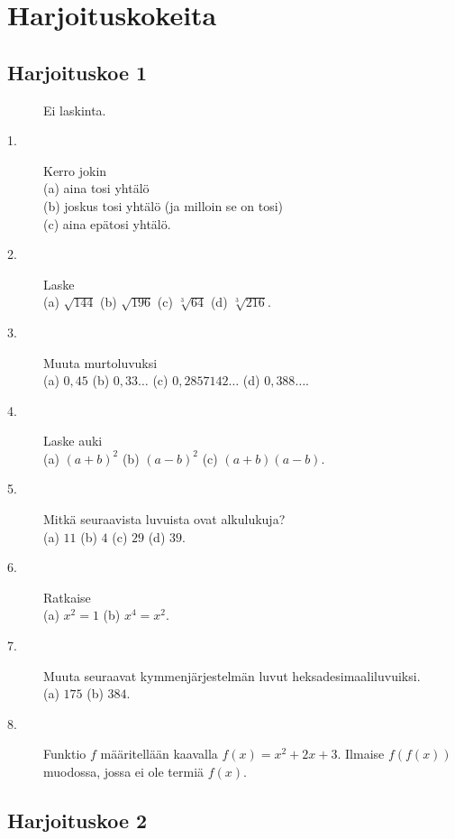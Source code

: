 \chapter{Harjoituskokeita}

\section*{Harjoituskoe 1}

\begin{description}
	\item[] Ei laskinta.
	\item[1.] Kerro jokin \\
	(a) aina tosi yhtälö \\
	(b) joskus tosi yhtälö (ja milloin se on tosi) \\
	(c) aina epätosi yhtälö.
	\item[2.] Laske \\
	(a) $\sqrt{144}$ \qquad
	(b) $\sqrt{196}$ \qquad
	(c) $\sqrt[3]{64}$ \qquad
	(d) $\sqrt[3]{216}$.
	\item[3.] Muuta murtoluvuksi \\
	(a) $0,45$ \qquad
	(b) $0,33\ldots$ \qquad
	(c) $0,2857142\ldots$ \qquad
	(d) $0,388\ldots$.
	\item[4.] Laske auki \\
	(a) $(a+b)^2$ \qquad
	(b) $(a-b)^2$ \qquad
	(c) $(a+b)(a-b)$.
	\item[5.] Mitkä seuraavista luvuista ovat alkulukuja? \\
	(a) $11$ \qquad
	(b) $4$ \qquad
	(c) $29$ \qquad
	(d) $39$.
	\item[6.] Ratkaise \\
	(a) $x^2 = 1$ \qquad
	(b) $x^4 = x^2$.
	\item[7.] Muuta seuraavat kymmenjärjestelmän luvut heksadesimaaliluvuiksi. \\
	(a) $175$ \qquad
	(b) $384$.
	\item[8.] Funktio $f$ määritellään kaavalla $f(x) = x^2 + 2x + 3$. Ilmaise $f(f(x))$ muodossa, jossa ei ole termiä $f(x)$.
\end{description}

\section*{Harjoituskoe 2}

